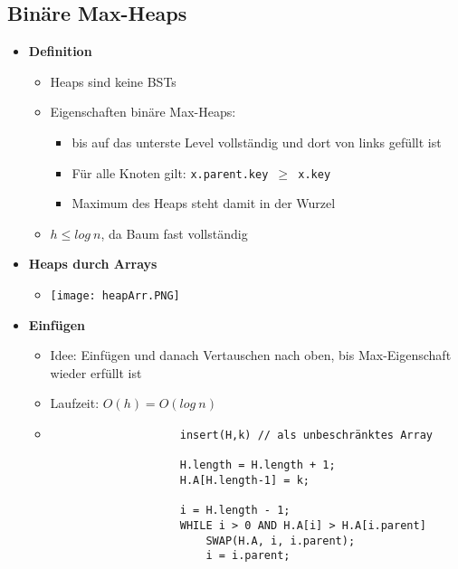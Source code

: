 \subsection{Binäre Max-Heaps}
    \begin{itemize}
        \item \textbf{Definition}
            \begin{itemize}
                \item Heaps sind keine BSTs
                \item Eigenschaften binäre Max-Heaps:
                    \begin{itemize}
                        \item bis auf das unterste Level vollständig und dort von links gefüllt ist
                        \item Für alle Knoten gilt: \texttt{x.parent.key $\geq$ x.key}
                        \item Maximum des Heaps steht damit in der Wurzel
                    \end{itemize}
                \item $h \leq log~n$, da Baum fast vollständig
            \end{itemize}

        \item \textbf{Heaps durch Arrays}
            \begin{itemize}
                \item[] \texttt{[image: heapArr.PNG]}
            \end{itemize}

\pagebreak

        \item \textbf{Einfügen}
            \begin{itemize}
                \item Idee: Einfügen und danach Vertauschen nach oben, bis Max-Eigenschaft wieder erfüllt ist
                \item Laufzeit: $O(h) = O(log~n)$
                \item[]
                    \begin{verbatim}
                    insert(H,k) // als unbeschränktes Array

                    H.length = H.length + 1;
                    H.A[H.length-1] = k;

                    i = H.length - 1;
                    WHILE i > 0 AND H.A[i] > H.A[i.parent]
                        SWAP(H.A, i, i.parent);
                        i = i.parent;
                    \end{verbatim}
            \end{itemize}


\end{itemize}
